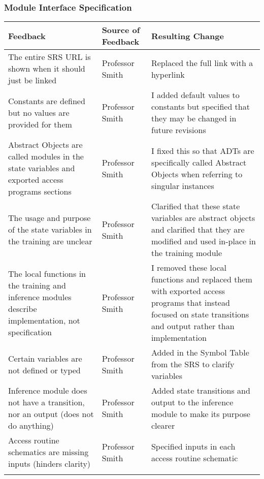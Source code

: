 \documentclass{article}
\begin{document}
\subsubsection{Module Interface Specification}
\begin{longtable}{p{5cm}p{4cm}p{5cm}}\toprule
    Feedback & Source of Feedback & Resulting Change \\\midrule
    
    The entire SRS URL is shown when it should just be linked & Professor Smith & Replaced the full link with a hyperlink \\
    \addlinespace[0.5cm]

    Constants are defined but no values are provided for them & Professor Smith & I added default values to constants but specified that they may be changed in future revisions \\
    \addlinespace[0.5cm]

    Abstract Objects are called modules in the state variables and exported access programs sections & Professor Smith & I fixed this so that ADTs are specifically called Abstract Objects when referring to singular instances \\
    \addlinespace[0.5cm]

    The usage and purpose of the state variables in the training are unclear & Professor Smith & Clarified that these state variables are abstract objects and clarified that they are modified and used in-place in the training module \\
    \addlinespace[0.5cm]

    The local functions in the training and inference modules describe implementation, not specification & Professor Smith & I removed these local functions and replaced them with exported access programs that instead focused on state transitions and output rather than implementation \\
    \addlinespace[0.5cm]

    Certain variables are not defined or typed & Professor Smith & Added in the Symbol Table from the SRS to clarify variables \\
    \addlinespace[0.5cm]

    Inference module does not have a transition, nor an output (does not do anything) & Professor Smith & Added state transitions and output to the inference module to make its purpose clearer \\
    \addlinespace[0.5cm]

    Access routine schematics are missing inputs (hinders clarity) & Professor Smith & Specified inputs in each access routine schematic \\
    \addlinespace[0.5cm]


\end{longtable}
\end{document}
